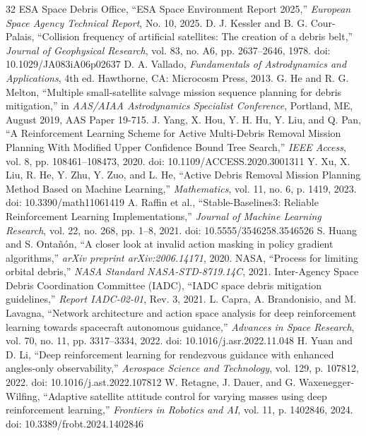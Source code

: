 \documentclass[10pt,conference,a4paper]{IEEEtran}
\begin{document}
\begin{thebibliography}{32}
 ESA Space Debris Office, ``ESA Space Environment Report 2025,'' \textit{European Space Agency Technical Report}, No. 10, 2025.
 D. J. Kessler and B. G. Cour-Palais, ``Collision frequency of artificial satellites: The creation of a debris belt,'' \textit{Journal of Geophysical Research}, vol. 83, no. A6, pp. 2637--2646, 1978. doi: 10.1029/JA083iA06p02637
 D. A. Vallado, \textit{Fundamentals of Astrodynamics and Applications}, 4th ed. Hawthorne, CA: Microcosm Press, 2013.
 G. He and R. G. Melton, ``Multiple small-satellite salvage mission sequence planning for debris mitigation,'' in \textit{AAS/AIAA Astrodynamics Specialist Conference}, Portland, ME, August 2019, AAS Paper 19-715.
 J. Yang, X. Hou, Y. H. Hu, Y. Liu, and Q. Pan, ``A Reinforcement Learning Scheme for Active Multi-Debris Removal Mission Planning With Modified Upper Confidence Bound Tree Search,'' \textit{IEEE Access}, vol. 8, pp. 108461--108473, 2020. doi: 10.1109/ACCESS.2020.3001311
 Y. Xu, X. Liu, R. He, Y. Zhu, Y. Zuo, and L. He, ``Active Debris Removal Mission Planning Method Based on Machine Learning,'' \textit{Mathematics}, vol. 11, no. 6, p. 1419, 2023. doi: 10.3390/math11061419
 A. Raffin et al., ``Stable-Baselines3: Reliable Reinforcement Learning Implementations,'' \textit{Journal of Machine Learning Research}, vol. 22, no. 268, pp. 1--8, 2021. doi: 10.5555/3546258.3546526
 S. Huang and S. Ontañón, ``A closer look at invalid action masking in policy gradient algorithms,'' \textit{arXiv preprint arXiv:2006.14171}, 2020.
 NASA, ``Process for limiting orbital debris,'' \textit{NASA Standard NASA-STD-8719.14C}, 2021.
 Inter-Agency Space Debris Coordination Committee (IADC), ``IADC space debris mitigation guidelines,'' \textit{Report IADC-02-01}, Rev. 3, 2021.
 L. Capra, A. Brandonisio, and M. Lavagna, ``Network architecture and action space analysis for deep reinforcement learning towards spacecraft autonomous guidance,'' \textit{Advances in Space Research}, vol. 70, no. 11, pp. 3317--3334, 2022. doi: 10.1016/j.asr.2022.11.048
 H. Yuan and D. Li, ``Deep reinforcement learning for rendezvous guidance with enhanced angles-only observability,'' \textit{Aerospace Science and Technology}, vol. 129, p. 107812, 2022. doi: 10.1016/j.ast.2022.107812
 W. Retagne, J. Dauer, and G. Waxenegger-Wilfing, ``Adaptive satellite attitude control for varying masses using deep reinforcement learning,'' \textit{Frontiers in Robotics and AI}, vol. 11, p. 1402846, 2024. doi: 10.3389/frobt.2024.1402846

\end{thebibliography}
\end{document}
